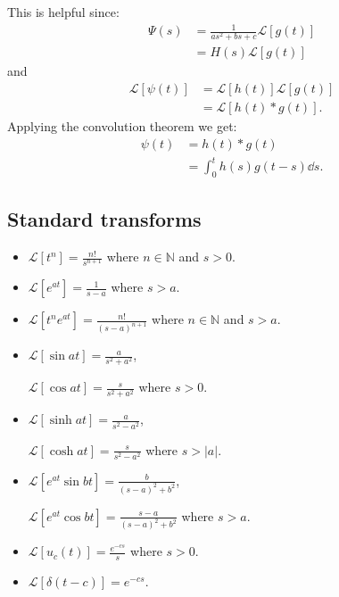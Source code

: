\documentclass{article}
\begin{document}
\begin{multicols}{3}
This is helpful since:
\begin{align*}
    \Psi(s)
    &=\frac{1}{as^2+bs+c}\mathcal{L}[g(t)] \\
    &=H(s)\mathcal{L}[g(t)]
\end{align*}
and
\begin{align*}
    \mathcal{L}[\psi(t)]
    &=\mathcal{L}[h(t)]\mathcal{L}[g(t)] \\
    &=\mathcal{L}[h(t)*g(t)].
\end{align*}
Applying the convolution theorem we get:
\begin{align*}
    \psi(t)
    &=h(t)*g(t) \\
    &=\int_{0}^{t}h(s)g(t-s)\dd s.
\end{align*}

\subsection{Standard transforms}
\begin{itemize}
    \item $\displaystyle\mathcal{L}[t^n]
    =\frac{n!}{s^{n+1}}$
    where $n\in\mathbb{N}$ and $s>0$.

    \item $\displaystyle\mathcal{L}[e^{at}]
    =\frac{1}{s-a}$
    where $s>a$.

    \item $\displaystyle\mathcal{L}
    [t^n e^{at}]=\frac{n!}{(s-a)^{n+1}}$
    where $n\in\mathbb{N}$ and $s>a$.

    \item $\displaystyle\mathcal{L}
    [\sin at]=\frac{a}{s^2+a^2}$,
    
    $\displaystyle\mathcal{L}
    [\cos at]=\frac{s}{s^2+a^2}$
    where $s>0$.

    \item $\displaystyle\mathcal{L}
    [\sinh at]=\frac{a}{s^2-a^2}$,

    $\displaystyle\mathcal{L}
    [\cosh at]=\frac{s}{s^2-a^2}$
    where $s>|a|$.

    \item $\displaystyle\mathcal{L}
    [e^{at}\sin bt]=\frac{b}{(s-a)^2+b^2}$,

    $\displaystyle\mathcal{L}
    [e^{at}\cos bt]=\frac{s-a}{(s-a)^2+b^2}$
    where $s>a$.

    \item $\displaystyle\mathcal{L}
    [u_c(t)]=\frac{e^{-cs}}{s}$
    where $s>0$.

    \item $\displaystyle\mathcal{L}
    [\delta(t-c)]=e^{-cs}$.
\end{itemize}

\end{multicols}
\end{document}
